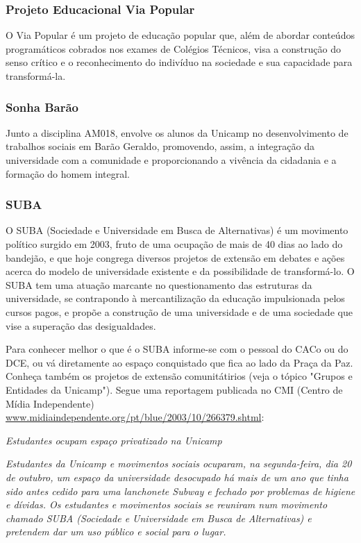 \subsubsection{Projeto Educacional Via Popular}

O Via Popular é um projeto de educação popular que, além de abordar conteúdos
programáticos cobrados nos exames de Colégios Técnicos, visa a construção do
senso crítico e o reconhecimento do indivíduo na sociedade e sua capacidade para
transformá-la.

\subsubsection{Sonha Barão}

Junto a disciplina AM018, envolve os alunos da Unicamp no desenvolvimento de
trabalhos sociais em Barão Geraldo, promovendo, assim, a integração da
universidade com a comunidade e proporcionando a vivência da cidadania
e a formação do homem integral.

\subsubsection{SUBA}

O SUBA (Sociedade e Universidade em Busca de Alternativas) é um movimento
político surgido em 2003, fruto de uma ocupação de mais de 40 dias ao lado do
bandejão, e que hoje congrega diversos projetos de extensão em debates e ações
acerca do modelo de universidade existente e da possibilidade de transformá-lo.
O SUBA tem uma atuação marcante no questionamento das estruturas da
universidade, se contrapondo à mercantilização da educação impulsionada pelos
cursos pagos, e propõe a construção de uma universidade e de uma sociedade que
vise a superação das desigualdades.

Para conhecer melhor o que é o SUBA informe-se com o pessoal do CACo ou do DCE,
ou vá diretamente ao espaço conquistado que fica ao lado da Praça da Paz.
Conheça também os projetos de extensão comunitátirios (veja o tópico "Grupos
e Entidades da Unicamp"). Segue uma reportagem publicada no CMI (Centro de Mídia
Independente)
\url{www.midiaindependente.org/pt/blue/2003/10/266379.shtml}:

\textit{Estudantes ocupam espaço privatizado na Unicamp}

\textit{Estudantes da Unicamp e movimentos sociais ocuparam, na segunda-feira, dia 20 de outubro, um espaço da universidade desocupado há mais de um ano que tinha sido antes cedido para uma lanchonete Subway e fechado por problemas de higiene e dívidas. Os estudantes e movimentos sociais se reuniram num movimento chamado SUBA (Sociedade e Universidade em Busca de Alternativas) e pretendem dar um uso público e social para o lugar.}

